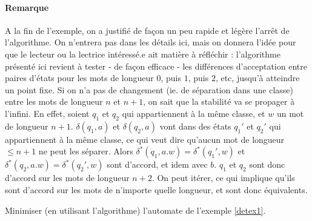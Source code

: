 \paragraph*{Remarque} A la fin de l'exemple, on a justifié de façon un peu rapide et légère l'arrêt de l'algorithme. On n'entrera pas dans les détails ici, mais on donnera l'idée pour que le lecteur ou la lectrice intéressé.e ait matière à réfléchir : l'algorithme présenté ici revient à tester - de façon efficace - les différences d'acceptation entre paires d'états pour les mots de longueur $0$, puis $1$, puis $2$, etc, jusqu'à atteindre un point fixe. Si on n'a pas de changement (ie. de séparation dans une classe) entre les mots de longueur $n$ et $n+1$, on sait que la stabilité va se propager à l'infini. En effet, soient $q_1$ et $q_2$ qui appartiennent à la même classe, et $w$ un mot de longueur $n+1$. $\delta(q_1,a)$ et $\delta(q_2,a)$ vont dans des états $q_1'$ et $q_2'$ qui appartiennent à la même classe, ce qui veut dire qu'aucun mot de longueur $\leq n+1$ ne peut les séparer. Alors $\delta^*(q_1,a.w) = \delta^*(q_1',w)$ et $\delta^*(q_2,a.w) = \delta^*(q_2',w)$ sont d'accord, et idem avec $b$. $q_1$ et $q_2$ sont donc d'accord sur les mots de longueur $n+2$. On peut itérer, ce qui implique qu'ils sont d'accord sur les mots de n'importe quelle longueur, et sont donc équivalents. 


\begin{exercice}
Minimiser (en utilisant l'algorithme) l'automate de l'exemple \ref{detex1}.
\end{exercice}


